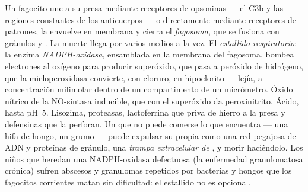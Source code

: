 \begin{definition}\label{def:b3:innate-immunity:killing}
Un fagocito une a su presa mediante receptores de opsoninas --- el C3b y
las regiones constantes de los anticuerpos --- o directamente mediante
receptores de patrones, la envuelve en membrana y cierra el
\emph{fagosoma}, que se fusiona con gránulos y . La muerte llega
por varios medios a la vez. El \emph{estallido respiratorio}: la enzima
\emph{NADPH-oxidasa}, ensamblada en la membrana del fagosoma, bombea
electrones al oxígeno para producir superóxido, que pasa a peróxido de
hidrógeno, que la mieloperoxidasa convierte, con cloruro, en hipoclorito
--- lejía, a concentración milimolar dentro de un compartimento de un
micrómetro. Óxido nítrico de la NO-sintasa inducible, que con el
superóxido da peroxinitrito. Ácido, hasta pH~5. Lisozima, proteasas,
lactoferrina que priva de hierro a la presa y defensinas que la perforan.
Un  que no puede comerse lo que encuentra --- una hifa de
hongo, un grumo --- puede expulsar su propia  como una red
pegajosa de ADN y proteínas de gránulo, una \emph{trampa extracelular de
}, y morir haciéndolo. Los niños que heredan una NADPH-oxidasa
defectuosa (la enfermedad granulomatosa crónica) sufren abscesos y
granulomas repetidos por bacterias y hongos que los fagocitos corrientes
matan sin dificultad: el estallido no es opcional.
\end{definition}

